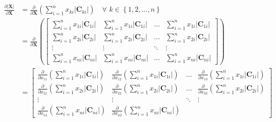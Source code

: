\documentclass{article}
\newcommand\abs[1]{\left\lvert#1\right\rvert}
\begin{document}
\begin{align}
    \frac{\partial \abs{\mathbf{X}}}{\partial \mathbf{X}} &= \frac{\partial}{\partial \mathbf{X}} \left( \sum_{i = 1}^{n} x_{ki} \abs{\mathbf{C}_{ki}} \right) \,\,\,\,\,\, \forall \,\, k \in \left\{ 1, 2, ..., n \right\} \\
    & = \frac{\partial}{\partial \mathbf{X}} \left( \begin{bmatrix}
        \displaystyle \sum_{i = 1}^{n} x_{1i} \abs{\mathbf{C}_{1i}} & 
        \displaystyle \sum_{i = 1}^{n} x_{1i} \abs{\mathbf{C}_{1i}} & 
        \dots & 
        \displaystyle \sum_{i = 1}^{n} x_{1i} \abs{\mathbf{C}_{1i}} \\
        \displaystyle \sum_{i = 1}^{n} x_{2i} \abs{\mathbf{C}_{2i}} & 
        \displaystyle \sum_{i = 1}^{n} x_{2i} \abs{\mathbf{C}_{2i}} & 
        \dots & 
        \displaystyle \sum_{i = 1}^{n} x_{2i} \abs{\mathbf{C}_{2i}} \\
        \vdots & \vdots & \ddots & \vdots \\
        \displaystyle \sum_{i = 1}^{n} x_{ni} \abs{\mathbf{C}_{ni}} & 
        \displaystyle \sum_{i = 1}^{n} x_{ni} \abs{\mathbf{C}_{ni}} & 
        \dots & 
        \displaystyle \sum_{i = 1}^{n} x_{ni} \abs{\mathbf{C}_{ni}}
    \end{bmatrix} \right) \\
    & = \begin{bmatrix}
        \displaystyle \frac{\partial}{\partial x_{11}} \left( \sum_{i = 1}^{n} x_{1i} \abs{\mathbf{C}_{1i}} \right) & 
        \displaystyle \frac{\partial}{\partial x_{12}} \left( \sum_{i = 1}^{n} x_{1i} \abs{\mathbf{C}_{1i}} \right) & 
        \dots & 
        \displaystyle \frac{\partial}{\partial x_{13}} \left( \sum_{i = 1}^{n} x_{1i} \abs{\mathbf{C}_{1i}} \right) \\
        \displaystyle \frac{\partial}{\partial x_{21}} \left( \sum_{i = 1}^{n} x_{2i} \abs{\mathbf{C}_{2i}} \right) & 
        \displaystyle \frac{\partial}{\partial x_{22}} \left( \sum_{i = 1}^{n} x_{2i} \abs{\mathbf{C}_{2i}} \right) & 
        \dots & 
        \displaystyle \frac{\partial}{\partial x_{33}} \left( \sum_{i = 1}^{n} x_{2i} \abs{\mathbf{C}_{2i}} \right) \\
        \vdots & \vdots & \ddots & \vdots \\
        \displaystyle \frac{\partial}{\partial x_{n1}} \left( \sum_{i = 1}^{n} x_{ni} \abs{\mathbf{C}_{ni}} \right) & 
        \displaystyle \frac{\partial}{\partial x_{n2}} \left( \sum_{i = 1}^{n} x_{ni} \abs{\mathbf{C}_{ni}} \right) & 

\end{bmatrix}
\end{align}
\end{document}

